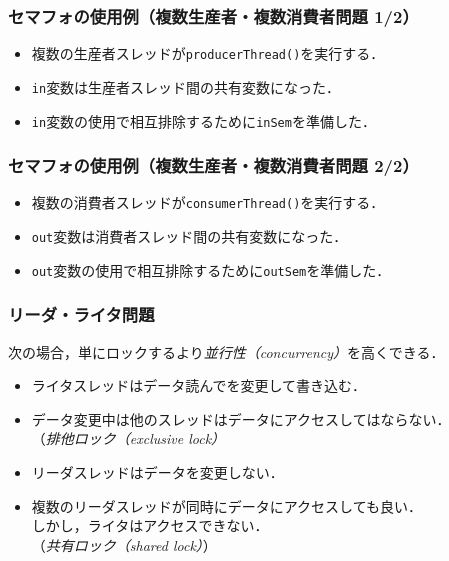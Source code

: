 \documentclass[handout]{beamer}                   %
\begin{document}
\begin{frame}
  \frametitle{セマフォの使用例（複数生産者・複数消費者問題 1/2）}
  \begin{itemize}
  \item 複数の生産者スレッドが\texttt{producerThread()}を実行する．
  \item \texttt{in}変数は生産者スレッド間の共有変数になった．
  \item \texttt{in}変数の使用で相互排除するために\texttt{inSem}を準備した．
  \end{itemize}
  \vfill
\end{frame}

\begin{frame}
  \frametitle{セマフォの使用例（複数生産者・複数消費者問題 2/2）}
  \begin{itemize}
  \item 複数の消費者スレッドが\texttt{consumerThread()}を実行する．
  \item \texttt{out}変数は消費者スレッド間の共有変数になった．
  \item \texttt{out}変数の使用で相互排除するために\texttt{outSem}を準備した．
  \end{itemize}
  \vfill
\end{frame}

\begin{frame}
  \frametitle{リーダ・ライタ問題}
  次の場合，単にロックするより\emph{並行性（concurrency）}を高くできる．
  \vfill
  \begin{itemize}
  \item ライタスレッドはデータ読んでを変更して書き込む．
  \item データ変更中は他のスレッドはデータにアクセスしてはならない．\\
    （\emph{排他ロック（exclusive lock）}
      \vfill
  \item リーダスレッドはデータを変更しない．
  \item 複数のリーダスレッドが同時にデータにアクセスしても良い．\\
    しかし，ライタはアクセスできない．\\
    （\emph{共有ロック（shared lock）}）
  \end{itemize}
  \vfill
\end{frame}
\end{document}
